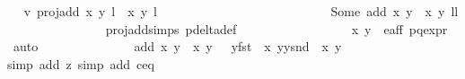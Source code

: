 \begin{isabellebody}
\ \isamarkupfalse%
\ v{}{\isacharcolon}\ {\isachardoublequoteopen}proj{\isacharunderscore}add\ {\isacharparenleft}{\isacharparenleft}x{\isacharcomma}\ y{\isacharparenright}{\isacharcomma}\ l{\isacharparenright}\ {\isacharparenleft}{\isasymtau}\ {\isacharparenleft}x{\isacharprime}{\isacharcomma}\ y{\isacharprime}{\isacharparenright}{\isacharcomma}\ l{\isacharprime}\ {\isacharplus}\ {}{\isacharparenright}\ {\isacharequal}\ \isanewline
\ \ \ \ \ \ \ \ \ \ \ \ \ \ \ \ \ \ \ \ \ \ \ Some\ {\isacharparenleft}add\ {\isacharparenleft}x{\isacharcomma}\ y{\isacharparenright}\ {\isacharparenleft}{\isasymtau}\ {\isacharparenleft}x{\isacharprime}{\isacharcomma}\ y{\isacharprime}{\isacharparenright}{\isacharparenright}{\isacharcomma}\ l{\isacharplus}l{\isacharprime}{\isacharplus}{}{\isacharparenright}{\isachardoublequoteclose}\isanewline
\ \ \ \ \ \ \ \ \ \ \ \ \ \ \isamarkupfalse%
\ proj{\isacharunderscore}add{\isachardot}simps\ p{\isacharunderscore}delta{\isacharunderscore}def\ \isanewline
\ \ \ \ \ \ \ \ \ \ \ \ \ \ \isamarkupfalse%
\ {\isacartoucheopen}{\isasymtau}\ {\isacharparenleft}x{\isacharprime}{\isacharcomma}\ y{\isacharprime}{\isacharparenright}\ {\isasymin}\ e{\isacharunderscore}aff{\isacartoucheclose}\ p{\isacharunderscore}q{\isacharunderscore}expr{\isacharparenleft}{}{\isacharparenright}\ \isamarkupfalse%
\ auto\ \isanewline
\ \ \ \ \ \ \ \ \ \ \ \ \isamarkupfalse%
\ {\isachardoublequoteopen}add\ {\isacharparenleft}x{\isacharcomma}\ y{\isacharparenright}\ {\isacharparenleft}{\isasymtau}\ {\isacharparenleft}x{\isacharprime}{\isacharcomma}\ y{\isacharprime}{\isacharparenright}{\isacharparenright}\ {\isacharequal}\ {\isasymrho}\ {\isacharparenleft}y{\isacharasterisk}{\isacharparenleft}fst\ {\isacharparenleft}{\isasymtau}\ {\isacharparenleft}x{\isacharprime}{\isacharcomma}\ y{\isacharprime}{\isacharparenright}{\isacharparenright}{\isacharparenright}{\isacharcomma}y{\isacharasterisk}{\isacharparenleft}snd\ {\isacharparenleft}{\isasymtau}\ {\isacharparenleft}x{\isacharprime}{\isacharcomma}\ y{\isacharprime}{\isacharparenright}{\isacharparenright}{\isacharparenright}{\isacharparenright}{\isachardoublequoteclose}\isanewline
\ \ \ \ \ \ \ \ \ \ \ \ \ \ \isamarkupfalse%
{\isacharparenleft}simp\ add{\isacharcolon}\ z{}{\isacharcomma}\ simp\ add{\isacharcolon}\ c{\isacharunderscore}eq{\isacharunderscore}{}{\isacharparenright}\isanewline
\ \ \ \ \ \ \ \ \ \ \ \ \isamarkupfalse%
\ \isamarkupfalse%

\end{isabellebody}

